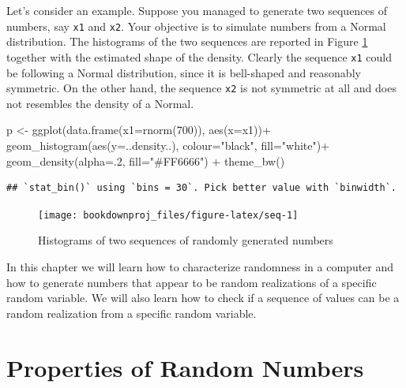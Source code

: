 \documentclass[
]{book}
\newenvironment{Shaded}{\begin{snugshade}}{\end{snugshade}}
\newcommand{\AttributeTok}[1]{\textcolor[rgb]{0.77,0.63,0.00}{#1}}
\newcommand{\DecValTok}[1]{\textcolor[rgb]{0.00,0.00,0.81}{#1}}
\newcommand{\FunctionTok}[1]{\textcolor[rgb]{0.00,0.00,0.00}{#1}}
\newcommand{\NormalTok}[1]{#1}
\newcommand{\OtherTok}[1]{\textcolor[rgb]{0.56,0.35,0.01}{#1}}
\newcommand{\SpecialCharTok}[1]{\textcolor[rgb]{0.00,0.00,0.00}{#1}}
\newcommand{\StringTok}[1]{\textcolor[rgb]{0.31,0.60,0.02}{#1}}
\theoremstyle{definition}
\theoremstyle{definition}
\theoremstyle{definition}
\theoremstyle{definition}
\theoremstyle{remark}
\begin{document}
Let's consider an example. Suppose you managed to generate two sequences of numbers, say \texttt{x1} and \texttt{x2}. Your objective is to simulate numbers from a Normal distribution. The histograms of the two sequences are reported in Figure \ref{fig:seq} together with the estimated shape of the density. Clearly the sequence \texttt{x1} could be following a Normal distribution, since it is bell-shaped and reasonably symmetric. On the other hand, the sequence \texttt{x2} is not symmetric at all and does not resembles the density of a Normal.

\begin{Shaded}
\begin{Highlighting}[]
\NormalTok{p }\OtherTok{\textless{}{-}} \FunctionTok{ggplot}\NormalTok{(}\FunctionTok{data.frame}\NormalTok{(}\AttributeTok{x1=}\FunctionTok{rnorm}\NormalTok{(}\DecValTok{700}\NormalTok{)), }\FunctionTok{aes}\NormalTok{(}\AttributeTok{x=}\NormalTok{x1))}\SpecialCharTok{+}
   \FunctionTok{geom\_histogram}\NormalTok{(}\FunctionTok{aes}\NormalTok{(}\AttributeTok{y=}\NormalTok{..density..), }\AttributeTok{colour=}\StringTok{"black"}\NormalTok{, }\AttributeTok{fill=}\StringTok{"white"}\NormalTok{)}\SpecialCharTok{+}
 \FunctionTok{geom\_density}\NormalTok{(}\AttributeTok{alpha=}\NormalTok{.}\DecValTok{2}\NormalTok{, }\AttributeTok{fill=}\StringTok{"\#FF6666"}\NormalTok{)  }\SpecialCharTok{+} \FunctionTok{theme\_bw}\NormalTok{() }
\end{Highlighting}
\end{Shaded}

\begin{verbatim}
## `stat_bin()` using `bins = 30`. Pick better value with `binwidth`.
\end{verbatim}

\begin{figure}

{\centering \texttt{[image: bookdownproj\_files/figure-latex/seq-1]} 

}

\caption{Histograms of two sequences of randomly generated numbers}\label{fig:seq}
\end{figure}

In this chapter we will learn how to characterize randomness in a computer and how to generate numbers that appear to be random realizations of a specific random variable. We will also learn how to check if a sequence of values can be a random realization from a specific random variable.

\hypertarget{properties-of-random-numbers}{%
\section{Properties of Random Numbers}\label{properties-of-random-numbers}}
\end{document}
